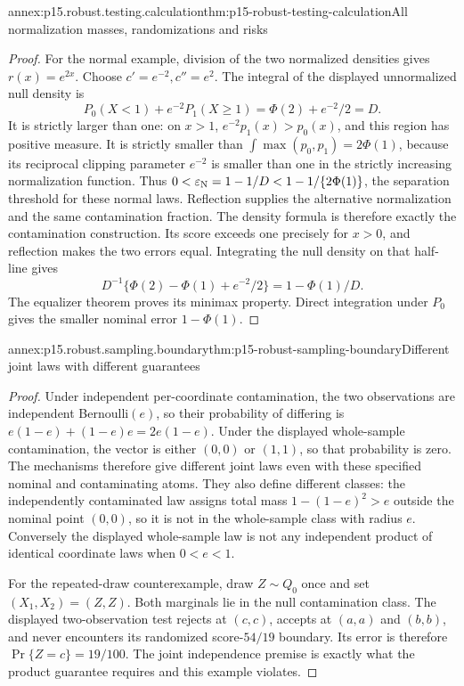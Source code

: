 \begin{annexitem}{annex:p15.robust.testing.calculation}{thm:p15-robust-testing-calculation}{All normalization masses, randomizations and risks}
\begin{proof}
For the normal example, division of the two normalized densities gives
\(r(x)=e^{2x}\). Choose \(c'=e^{-2},c''=e^2\).
The integral of the displayed unnormalized null density is
\[
 P_0(X<1)+e^{-2}P_1(X\geq1)=\Phi(2)+e^{-2}/2=D.
\]
It is strictly larger than one: on \(x>1\),
\(e^{-2}p_1(x)>p_0(x)\), and this region has positive measure.
It is strictly smaller than \(\int\max(p_0,p_1)=2\Phi(1)\),
because its reciprocal clipping parameter \(e^{-2}\) is smaller
than one in the strictly increasing normalization function.
Thus \(0<\varepsilon_{\rm N}=1-1/D<1-1/\{2\Phi(1)\}\), the separation threshold
for these normal laws. Reflection supplies the alternative
normalization and the same contamination fraction.
The density formula is therefore exactly the contamination construction.
Its score exceeds one precisely for \(x>0\), and reflection makes the
two errors equal. Integrating the null density on that half-line gives
\[
 D^{-1}\{\Phi(2)-\Phi(1)+e^{-2}/2\}=1-\Phi(1)/D.
\]
The equalizer theorem proves its minimax property. Direct integration
under \(P_0\) gives the smaller nominal error \(1-\Phi(1)\).
\end{proof}
\end{annexitem}

\begin{annexitem}{annex:p15.robust.sampling.boundary}{thm:p15-robust-sampling-boundary}{Different joint laws with different guarantees}
\begin{proof}
Under independent per-coordinate contamination, the two observations
are independent Bernoulli\((e)\), so their probability of differing is
\(e(1-e)+(1-e)e=2e(1-e)\).
Under the displayed whole-sample contamination, the vector is either
\((0,0)\) or \((1,1)\), so that probability is zero.
The mechanisms therefore give different joint laws even with these
specified nominal and contaminating atoms.
They also define different classes: the independently contaminated law
assigns total mass \(1-(1-e)^2>e\) outside the nominal point \((0,0)\),
so it is not in the whole-sample class with radius \(e\).
Conversely the displayed whole-sample law is not any independent
product of identical coordinate laws when \(0<e<1\).

For the repeated-draw counterexample, draw \(Z\sim Q_0\) once and set
\((X_1,X_2)=(Z,Z)\). Both marginals lie in the null contamination class.
The displayed two-observation test rejects at \((c,c)\), accepts at
\((a,a)\) and \((b,b)\), and never encounters its randomized
score-\(54/19\) boundary. Its error is therefore
\(\Pr\{Z=c\}=19/100\).
The joint independence premise is exactly what the product guarantee
requires and this example violates.
\end{proof}
\end{annexitem}

